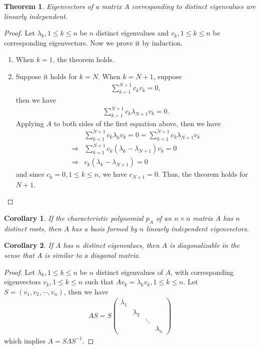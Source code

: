 \documentclass[11pt]{book}
\newtheorem{theorem}{Theorem}[section]
\newtheorem{corollary}{Corollary}[section]
\theoremstyle{definition}
\numberwithin{equation}{subsection}
\begin{document}
\begin{theorem}
Eigenvectors of a matrix $A$ corresponding to distinct eigenvalues
are linearly independent.
\end{theorem}
\begin{proof}
Let $\lambda_k, 1\leq k \leq n$ be $n$ distinct eigenvalues and $v_k, 1\leq k \leq n$ be corresponding eigenvectors. Now we prove it by induction.
\begin{enumerate}[label=(\arabic*)]
    \item When $k = 1$, the theorem holds.
    \item Suppose it holds for $k = N$. When $k = N+1$, suppose 
    \begin{align*}
        \sum^{N+1}_{k=1}c_k v_k = 0,
    \end{align*}
    then we have
    \begin{align*}
        \sum^{N+1}_{k=1}c_k \lambda_{N+1} v_k = 0.
    \end{align*}
    Applying $A$ to both sides of the first equation above, then we have
    \begin{align*}
        & \sum^{N+1}_{k=1}c_k \lambda_k v_k = 0 = \sum^{N+1}_{k=1}c_k \lambda_{N+1} v_k \\
        \Rightarrow & \sum^{N+1}_{k=1}c_k (\lambda_k  - \lambda_{N+1}) v_k = 0 \\
        \Rightarrow & c_k (\lambda_k  - \lambda_{N+1}) = 0
    \end{align*}
    and since $c_k = 0, 1\leq k\leq n$, we have $c_{N+1} = 0$. Thus, the theorem holds for $N+1$. 
\end{enumerate}
\end{proof}

\medskip

\begin{corollary}
If the characteristic polynomial $p_A$ of an $n\times n$ matrix $A$ has $n$ distinct roots, then $A$ has a basis formed by $n$ linearly independent eigenvectors.
\end{corollary}

\medskip

\begin{corollary}
If $A$ has $n$ distinct eigenvalues, then $A$ is diagonalizable in the sense that $A$ is similar to a diagonal matrix.
\end{corollary}
\begin{proof}
Let $\lambda_k,1\leq k\leq n$ be $n$ distinct eigenvalues of $A$, with corresponding eigenvectors $v_k,1\leq k\leq n$ such that $Av_k = \lambda_k v_k,1\leq k\leq n$. Let $S = (v_1, v_2,\cdots, v_n)$, then we have
\begin{align*}
    AS = S \begin{pmatrix}
    \lambda_1 &  &  &  \\
     & \lambda_2 &  & \\
     &   & \ddots &  \\
     &  &  & \lambda_n
    \end{pmatrix}
\end{align*}
which implies $A = S\Lambda S^{-1}$.
\end{proof}
\end{document}
